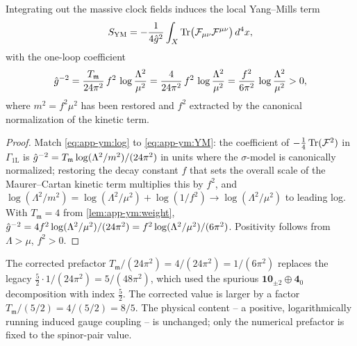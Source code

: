 \begin{theorem}
\label{thm:app-ym:coupling}
Integrating out the massive clock fields induces the local Yang--Mills
term
\begin{equation}\label{eq:app-ym:YM}
  S_{\mathrm{YM}}
  =-\frac{1}{4\hat g^{2}}\int_{X}
    \operatorname{Tr}\bigl(\mathcal F_{\mu\nu}\mathcal F^{\mu\nu}\bigr)\,d^{4}x ,
\end{equation}
with the one-loop coefficient
\begin{equation}\label{eq:app-ym:ghat}
  \hat g^{-2}
  =\frac{T_{\mathfrak m}}{24\pi^{2}}\,f^{2}\,
   \log\frac{\Lambda^{2}}{\mu^{2}}
  =\frac{4}{24\pi^{2}}\,f^{2}\,\log\frac{\Lambda^{2}}{\mu^{2}}
  =\frac{f^{2}}{6\pi^{2}}\,\log\frac{\Lambda^{2}}{\mu^{2}}
  >0 ,
\end{equation}
where $m^{2}=f^{2}\mu^{2}$ has been restored and $f^{2}$ extracted by
the canonical normalization of the kinetic term.
\end{theorem}

\begin{proof}
Match \eqref{eq:app-ym:log} to \eqref{eq:app-ym:YM}: the coefficient of
$-\tfrac14\operatorname{Tr}(\mathcal F^{2})$ in $\Gamma_{\mathrm{1L}}$ is
$\hat g^{-2}=T_{\mathfrak m}\log(\Lambda^{2}/m^{2})/(24\pi^{2})$ in units
where the $\sigma$-model is canonically normalized; restoring the decay
constant $f$ that sets the overall scale of the Maurer--Cartan kinetic
term multiplies this by $f^{2}$, and $\log(\Lambda^{2}/m^{2})
=\log(\Lambda^{2}/\mu^{2})+\log(1/f^{2})\to\log(\Lambda^{2}/\mu^{2})$ to
leading log. With $T_{\mathfrak m}=4$ from \autoref{lem:app-ym:weight},
$\hat g^{-2}=4f^{2}\log(\Lambda^{2}/\mu^{2})/(24\pi^{2})
=f^{2}\log(\Lambda^{2}/\mu^{2})/(6\pi^{2})$. Positivity follows from
$\Lambda>\mu$, $f^{2}>0$.
\end{proof}

\begin{remark}
\label{rem:app-ym:legacy}
The corrected prefactor $T_{\mathfrak m}/(24\pi^{2})=4/(24\pi^{2})
=1/(6\pi^{2})$ replaces the legacy
$\tfrac52\cdot 1/(24\pi^{2})=5/(48\pi^{2})$, which used the spurious
$\mathbf{10}_{\pm2}\oplus\mathbf 4_{0}$ decomposition with index
$\tfrac52$. The corrected value is larger by a factor
$T_{\mathfrak m}/(5/2)=4/(5/2)=8/5$. The physical content -- a
positive, logarithmically running induced gauge coupling -- is unchanged;
only the numerical prefactor is fixed to the spinor-pair value.
\end{remark}

